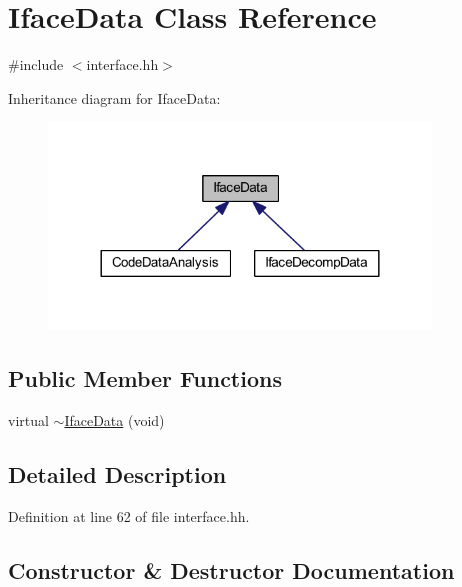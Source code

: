 \hypertarget{class_iface_data}{}\section{Iface\+Data Class Reference}
\label{class_iface_data}


{\ttfamily \#include $<$interface.\+hh$>$}



Inheritance diagram for Iface\+Data\+:
\nopagebreak
\begin{figure}[H]
\begin{center}
\leavevmode
\includegraphics[width=288pt]{class_iface_data__inherit__graph}
\end{center}
\end{figure}
\subsection*{Public Member Functions}
\begin{DoxyCompactItemize}
\item 
virtual \mbox{\hyperlink{class_iface_data_acb59d7867f44101a673cb6572771ade7}{$\sim$\+Iface\+Data}} (void)
\end{DoxyCompactItemize}


\subsection{Detailed Description}


Definition at line 62 of file interface.\+hh.



\subsection{Constructor \& Destructor Documentation}
\mbox{\label{class_iface_data_acb59d7867f44101a673cb6572771ade7}} 
